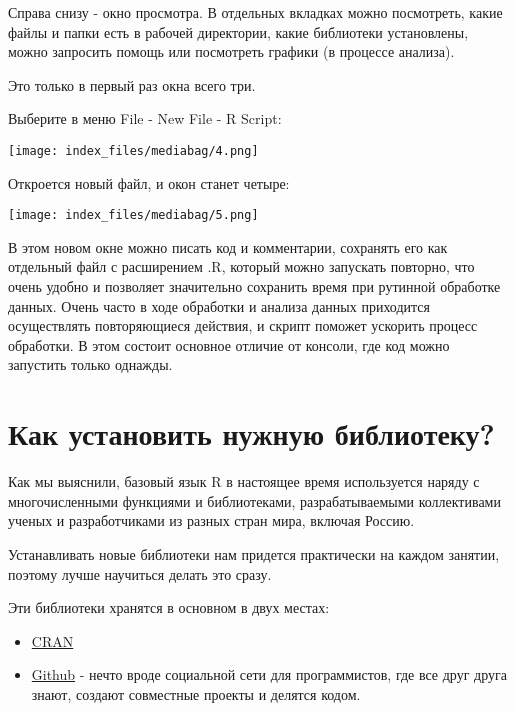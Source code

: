 \documentclass[
  letterpaper,
  DIV=11,
  numbers=noendperiod]{scrreprt}
\providecommand{\tightlist}{%
  \setlength{\itemsep}{0pt}\setlength{\parskip}{0pt}}\usepackage{longtable,booktabs,array}
\begin{document}
Справа снизу - окно просмотра. В отдельных вкладках можно посмотреть,
какие файлы и папки есть в рабочей директории, какие библиотеки
установлены, можно запросить помощь или посмотреть графики (в процессе
анализа).

Это только в первый раз окна всего три.

Выберите в меню File - New File - R Script:

\texttt{[image: index\_files/mediabag/4.png]}

Откроется новый файл, и окон станет четыре:

\texttt{[image: index\_files/mediabag/5.png]}

В этом новом окне можно писать код и комментарии, сохранять его как
отдельный файл с расширением .R, который можно запускать повторно, что
очень удобно и позволяет значительно сохранить время при рутинной
обработке данных. Очень часто в ходе обработки и анализа данных
приходится осуществлять повторяющиеся действия, и скрипт поможет
ускорить процесс обработки. В этом состоит основное отличие от консоли,
где код можно запустить только однажды.

\hypertarget{ux43aux430ux43a-ux443ux441ux442ux430ux43dux43eux432ux438ux442ux44c-ux43dux443ux436ux43dux443ux44e-ux431ux438ux431ux43bux438ux43eux442ux435ux43aux443}{%
\section{Как установить нужную
библиотеку?}\label{ux43aux430ux43a-ux443ux441ux442ux430ux43dux43eux432ux438ux442ux44c-ux43dux443ux436ux43dux443ux44e-ux431ux438ux431ux43bux438ux43eux442ux435ux43aux443}}

Как мы выяснили, базовый язык R в настоящее время используется наряду с
многочисленными функциями и библиотеками, разрабатываемыми коллективами
ученых и разработчиками из разных стран мира, включая Россию.

Устанавливать новые библиотеки нам придется практически на каждом
занятии, поэтому лучше научиться делать это сразу.

Эти библиотеки хранятся в основном в двух местах:

\begin{itemize}
\tightlist
\item
  \href{https://cran.r-project.org/}{CRAN}
\item
  \href{https://github.com/}{Github} - нечто вроде социальной сети для
  программистов, где все друг друга знают, создают совместные проекты и
  делятся кодом.
\end{itemize}
\end{document}
